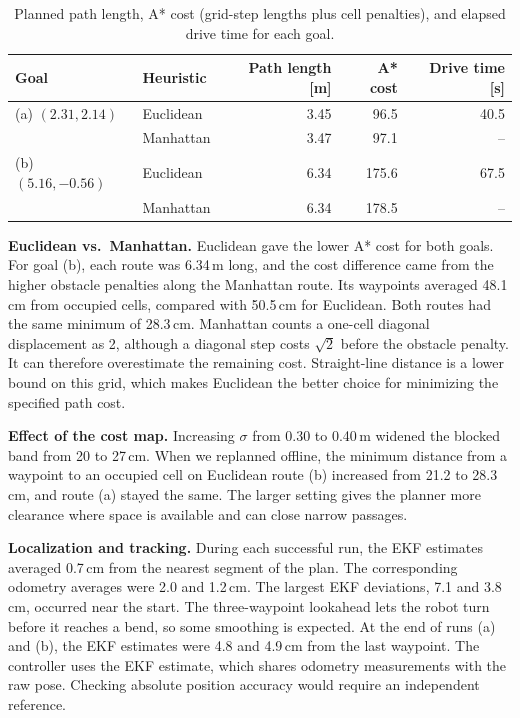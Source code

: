 \documentclass[11pt,twoside,letterpaper]{article}
\makeatletter
\renewcommand{\section}{\@startsection{section}{1}{0pt}{7pt}{4pt}{\large\bfseries}}
\newcommand{\para}[1]{\textbf{#1}\quad}
\makeatother
\begin{document}
\clearpage
\begin{table}[H]\centering\small
\caption{Planned path length, A* cost (grid-step lengths plus cell penalties), and elapsed drive time for each goal.}
\begin{tabular}{llrrr}\toprule
Goal & Heuristic & Path length [m] & A* cost & Drive time [s]\\\midrule
(a) $(2.31,2.14)$ & Euclidean & 3.45 & 96.5 & 40.5\\
                  & Manhattan & 3.47 & 97.1 & --\\
(b) $(5.16,-0.56)$ & Euclidean & 6.34 & 175.6 & 67.5\\
                   & Manhattan & 6.34 & 178.5 & --\\\bottomrule
\end{tabular}
\label{tab:heur}
\end{table}

\section{Discussion}

\para{Euclidean vs.\ Manhattan.} Euclidean gave the lower A* cost for both goals. For goal (b), each route was 6.34\,m long, and the cost difference came from the higher obstacle penalties along the Manhattan route. Its waypoints averaged 48.1\,cm from occupied cells, compared with 50.5\,cm for Euclidean. Both routes had the same minimum of 28.3\,cm. Manhattan counts a one-cell diagonal displacement as 2, although a diagonal step costs $\sqrt{2}$ before the obstacle penalty. It can therefore overestimate the remaining cost. Straight-line distance is a lower bound on this grid, which makes Euclidean the better choice for minimizing the specified path cost.

\para{Effect of the cost map.} Increasing $\sigma$ from 0.30 to 0.40\,m widened the blocked band from 20 to 27\,cm. When we replanned offline, the minimum distance from a waypoint to an occupied cell on Euclidean route (b) increased from 21.2 to 28.3\,cm, and route (a) stayed the same. The larger setting gives the planner more clearance where space is available and can close narrow passages.

\para{Localization and tracking.} During each successful run, the EKF estimates averaged 0.7\,cm from the nearest segment of the plan. The corresponding odometry averages were 2.0 and 1.2\,cm. The largest EKF deviations, 7.1 and 3.8\,cm, occurred near the start. The three-waypoint lookahead lets the robot turn before it reaches a bend, so some smoothing is expected. At the end of runs (a) and (b), the EKF estimates were 4.8 and 4.9\,cm from the last waypoint. The controller uses the EKF estimate, which shares odometry measurements with the raw pose. Checking absolute position accuracy would require an independent reference.
\end{document}
